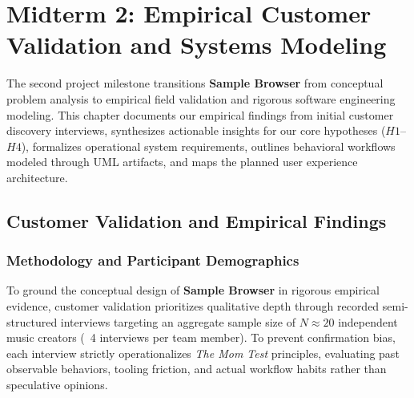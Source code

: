 \chapter{Midterm 2: Empirical Customer Validation and Systems Modeling}

The second project milestone transitions \textbf{Sample Browser} from conceptual problem analysis to empirical field validation and rigorous software engineering modeling. This chapter documents our empirical findings from initial customer discovery interviews, synthesizes actionable insights for our core hypotheses ($H1$--$H4$), formalizes operational system requirements, outlines behavioral workflows modeled through UML artifacts, and maps the planned user experience architecture.

\section{Customer Validation and Empirical Findings}

\subsection{Methodology and Participant Demographics}
To ground the conceptual design of \textbf{Sample Browser} in rigorous empirical evidence, customer validation prioritizes qualitative depth through recorded semi-structured interviews targeting an aggregate sample size of $N \approx 20$ independent music creators (~4 interviews per team member). To prevent confirmation bias, each interview strictly operationalizes \textit{The Mom Test} principles, evaluating past observable behaviors, tooling friction, and actual workflow habits rather than speculative opinions.

